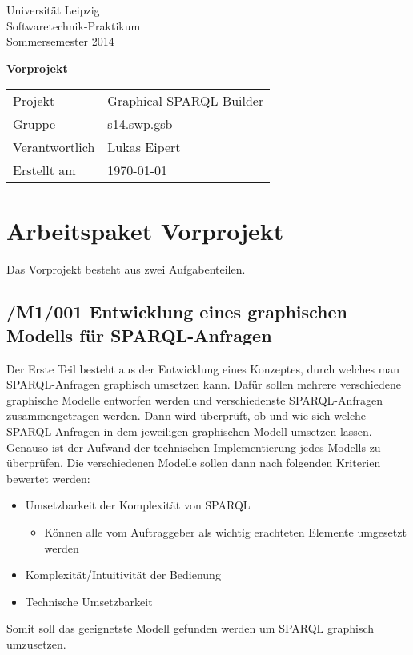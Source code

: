 
\def\verantwortlicher{Lukas Eipert} %
\thispagestyle{empty} 

\vspace*{2\baselineskip}

\begin{center}
\sffamily
Universität Leipzig\\
Softwaretechnik-Praktikum\\
Sommersemester 2014
\baselineskip

\bgroup
\Huge\textbf{Vorprojekt}
\egroup
{}\baselineskip

\begin{tabular}{ll}
Projekt & Graphical SPARQL Builder \\
Gruppe & s14.swp.gsb \\
Verantwortlich & \verantwortlicher\\
Erstellt am & \today \\
\end{tabular}
\end{center}

\vfill%

\tableofcontents

\pagebreak

\section{Arbeitspaket Vorprojekt}

Das Vorprojekt besteht aus zwei Aufgabenteilen.

\subsection*{/M1/001 Entwicklung eines graphischen Modells für SPARQL-Anfragen}
Der Erste Teil besteht aus der Entwicklung eines Konzeptes, durch
welches man SPARQL-Anfragen graphisch umsetzen kann. Dafür sollen
mehrere verschiedene graphische Modelle entworfen werden und
verschiedenste SPARQL-Anfragen zusammengetragen werden. Dann wird
überprüft, ob und wie sich welche SPARQL-Anfragen in dem jeweiligen
graphischen Modell umsetzen lassen. Genauso ist der Aufwand der
technischen Implementierung jedes Modells zu überprüfen. Die
verschiedenen Modelle sollen dann nach folgenden Kriterien bewertet
werden:
\begin{itemize}
\item Umsetzbarkeit der Komplexität von SPARQL
  \begin{itemize}
  \item Können alle vom Auftraggeber als wichtig erachteten Elemente
    umgesetzt werden
  \end{itemize}
\item Komplexität/Intuitivität der Bedienung
\item Technische Umsetzbarkeit
\end{itemize}
Somit soll das geeignetste Modell gefunden werden um SPARQL graphisch umzusetzen. 
